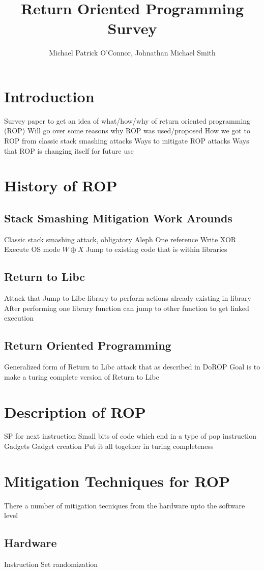 \documentclass[11pt]{amsart}
\title{Return Oriented Programming Survey}
\author{Michael Patrick O'Connor, Johnathan Michael Smith}
\date{}
\begin{document}
\maketitle

\newpage
\section*{Introduction}
Survey paper to get an idea of what/how/why of return oriented programming (ROP)
Will go over some reasons why ROP was used/proposed
How we got to ROP from classic stack smashing attacks
Ways to mitigate ROP attacks
Ways that ROP is changing itself for future use
\section*{History of ROP}
\subsection*{Stack Smashing Mitigation Work Arounds}
Classic stack smashing attack, obligatory Aleph One reference
Write XOR Execute OS mode $W \oplus X$
Jump to existing code that is within libraries
\subsection*{Return to Libc}
Attack that Jump to Libc library to perform actions already existing in library
After performing one library function can jump to other function to get linked execution
\subsection*{Return Oriented Programming}
Generalized form of Return to Libc attack that as described in DoROP
Goal is to make a turing complete version of Return to Libc
\section*{Description of ROP}
SP for next instruction
Small bits of code which end in a type of pop instruction
Gadgets
Gadget creation
Put it all together in turing completeness
\section*{Mitigation Techniques for ROP}
There a number of mitigation tecniques from the hardware upto the software level
\subsection*{Hardware}
Instruction Set randomization
\end{document}
